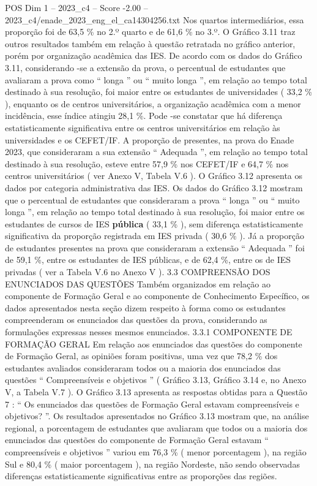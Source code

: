 \begin{textsample}{POS Dim 1 – 2023\_c4 – Score -2.00 – 2023\_c4/enade\_2023\_eng\_el\_ca14304256.txt}
Nos quartos intermediários, essa proporção foi de 63,5 \% no 2.º quarto e de 61,6 \% no 3.º.
O Gráfico 3.11 traz outros resultados também em relação à questão retratada no gráfico anterior, porém por organização acadêmica das IES.
De acordo com os dados do Gráfico 3.11, considerando -se a extensão da prova, o percentual de estudantes que avaliaram a prova como “ longa ” ou “ muito longa ”, em relação ao tempo total destinado à sua resolução, foi maior entre os estudantes de universidades ( 33,2 \% ), enquanto os de centros universitários, a organização acadêmica com a menor incidência, esse índice atingiu 28,1 \%.
Pode -se constatar que há diferença estatisticamente significativa entre os centros universitários em relação às universidades e os CEFET/IF.
A proporção de presentes, na prova do Enade 2023, que consideraram a sua extensão “ Adequada ”, em relação ao tempo total destinado à sua resolução, esteve entre 57,9 \% nos CEFET/IF e 64,7 \% nos centros universitários ( ver Anexo V, Tabela V.6 ).
O Gráfico 3.12 apresenta os dados por categoria administrativa das IES.
Os dados do Gráfico 3.12 mostram que o percentual de estudantes que consideraram a prova “ longa ” ou “ muito longa ”, em relação ao tempo total destinado à sua resolução, foi maior entre os estudantes de cursos de IES \textbf{pública} ( 33,1 \% ), sem diferença estatisticamente significativa da proporção registrada em IES privada ( 30,6 \% ).
Já a proporção de estudantes presentes na prova que consideraram a extensão “ Adequada ” foi de 59,1 \%, entre os estudantes de IES públicas, e de 62,4 \%, entre os de IES privadas ( ver a Tabela V.6 no Anexo V ). 3.3 COMPREENSÃO DOS ENUNCIADOS DAS QUESTÕES Também organizados em relação ao componente de Formação Geral e ao componente de Conhecimento Específico, os dados apresentados nesta seção dizem respeito à forma como os estudantes compreenderam os enunciados das questões da prova, considerando as formulações expressas nesses mesmos enunciados. 3.3.1 COMPONENTE DE FORMAÇÃO GERAL Em relação aos enunciados das questões do componente de Formação Geral, as opiniões foram positivas, uma vez que 78,2 \% dos estudantes avaliados consideraram todos ou a maioria dos enunciados das questões “ Compreensíveis e objetivos ” ( Gráfico 3.13, Gráfico 3.14 e, no Anexo V, a Tabela V.7 ).
O Gráfico 3.13 apresenta as respostas obtidas para a Questão 7 : “ Os enunciados das questões de Formação Geral estavam compreensíveis e objetivos? ”.
Os resultados apresentados no Gráfico 3.13 mostram que, na análise regional, a porcentagem de estudantes que avaliaram que todos ou a maioria dos enunciados das questões do componente de Formação Geral estavam “ compreensíveis e objetivos ” variou em 76,3 \% ( menor porcentagem ), na região Sul e 80,4 \% ( maior porcentagem ), na região Nordeste, não sendo observadas diferenças estatisticamente significativas entre as proporções das regiões.

\end{textsample}
